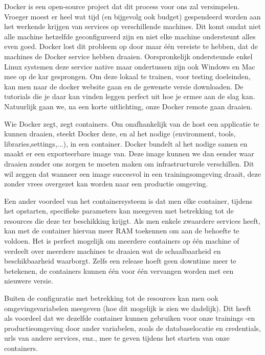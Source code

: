 \documentclass{article}
\begin{document}
	Docker is een open-source project dat dit process voor ons zal versimpelen. 
    Vroeger moest er heel wat tijd (en bijgevolg ook budget) gespendeerd worden aan het werkende krijgen van services op verschillende machines. 
    Dit komt omdat niet alle machine hetzelfde geconfigureerd zijn en niet elke machine ondersteunt alles even goed. 
    Docker lost dit probleem op door maar \'e\'en vereiste te hebben, dat de machines de Docker service hebben draaien. Oorspronkelijk ondersteunde enkel Linux systemen deze service native maar ondertussen zijn ook Windows en Mac mee op de kar gesprongen. Om deze lokaal te trainen, voor testing doeleinden, kan men naar de docker website gaan en de gewenste versie downloaden. De tutorials die je daar kan vinden leggen perfect uit hoe je ermee aan de slag kan. Natuurlijk gaan we, na een korte uitlichting, onze Docker remote gaan draaien.
	\par
	Wie Docker zegt, zegt containers. Om onafhankelijk van de host een applicatie te kunnen draaien, steekt Docker deze, en al het nodige (environment, tools, libraries,settings,...), in een container. Docker bundelt al het nodige samen en maakt er een exporteerbare image van. Deze image kunnen we dan eender waar draaien zonder ons zorgen te moeten maken om infrastructurele verschillen. Dit wil zeggen dat wanneer een image succesvol in een trainingsomgeving draait, deze zonder vrees overgezet kan worden naar een productie omgeving.
	\par
	Een ander voordeel van het containersysteem is dat men elke container, tijdens het opstarten, specifieke parameters kan meegeven met betrekking tot de resources die deze ter beschikking krijgt. Als men enkele zwaardere services heeft, kan met de container hiervan meer RAM toekennen om aan de behoefte te voldoen. Het is perfect mogelijk om meerdere containers op \'e\'en machine of verdeelt over meerdere machines te draaien wat de schaalbaarheid en beschikbaarheid waarborgt. Zelfs een release hoeft geen downtime meer te betekenen, de containers kunnen \'e\'en voor \'e\'en vervangen worden met een nieuwere versie.
	\par
	Buiten de configuratie met betrekking tot de resources kan men ook omgevingsvariabelen meegeven (hoe dit mogelijk is zien we dadelijk). Dit heeft als voordeel dat we dezelfde container kunnen gebruiken voor onze trainings -en productieomgeving door ander variabelen, zoals de databaselocatie en credentials, urls van andere services, enz., mee te geven tijdens het starten van onze containers.
\end{document}
